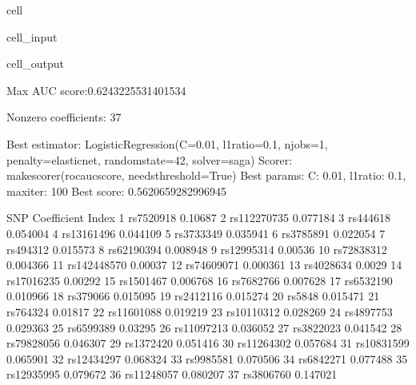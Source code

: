 \documentclass[letterpaper,10pt,english]{jupyterBook}
\begin{document}
\begin{sphinxuseclass}{cell}
\begin{sphinxVerbatimInput}
\begin{sphinxuseclass}{cell_input}
\end{sphinxuseclass}\end{sphinxVerbatimInput}
\begin{sphinxVerbatimOutput}

\begin{sphinxuseclass}{cell_output}
\begin{sphinxVerbatim}[commandchars=\\\{\}]
Max AUC score:0.6243225531401534

Non\PYGZhy{}zero coefficients: 37

Best estimator: LogisticRegression(C=0.01, l1\PYGZus{}ratio=0.1, n\PYGZus{}jobs=\PYGZhy{}1, penalty=\PYGZsq{}elasticnet\PYGZsq{},
                   random\PYGZus{}state=42, solver=\PYGZsq{}saga\PYGZsq{})
Scorer: make\PYGZus{}scorer(roc\PYGZus{}auc\PYGZus{}score, needs\PYGZus{}threshold=True)
Best params: \PYGZob{}\PYGZsq{}C\PYGZsq{}: 0.01, \PYGZsq{}l1\PYGZus{}ratio\PYGZsq{}: 0.1, \PYGZsq{}max\PYGZus{}iter\PYGZsq{}: 100\PYGZcb{}
Best score: 0.5620659282996945
\end{sphinxVerbatim}

\begin{sphinxVerbatim}[commandchars=\\\{\}]
               SNP Coefficient
Index                         
1        rs7520918    \PYGZhy{}0.10687
2      rs112270735   \PYGZhy{}0.077184
3         rs444618   \PYGZhy{}0.054004
4       rs13161496   \PYGZhy{}0.044109
5        rs3733349   \PYGZhy{}0.035941
6        rs3785891   \PYGZhy{}0.022054
7         rs494312   \PYGZhy{}0.015573
8       rs62190394   \PYGZhy{}0.008948
9       rs12995314    \PYGZhy{}0.00536
10      rs72838312   \PYGZhy{}0.004366
11     rs142448570    \PYGZhy{}0.00037
12      rs74609071    0.000361
13       rs4028634      0.0029
14      rs17016235     0.00292
15       rs1501467    0.006768
16       rs7682766    0.007628
17       rs6532190    0.010966
18        rs379066    0.015095
19       rs2412116    0.015274
20          rs5848    0.015471
21        rs764324     0.01817
22      rs11601088    0.019219
23      rs10110312    0.028269
24       rs4897753    0.029363
25       rs6599389     0.03295
26      rs11097213    0.036052
27       rs3822023    0.041542
28      rs79828056    0.046307
29       rs1372420    0.051416
30      rs11264302    0.057684
31      rs10831599    0.065901
32      rs12434297    0.068324
33       rs9985581    0.070506
34       rs6842271    0.077488
35      rs12935995    0.079672
36      rs11248057    0.080207
37       rs3806760    0.147021
\end{sphinxVerbatim}

\end{sphinxuseclass}\end{sphinxVerbatimOutput}

\end{sphinxuseclass}
\end{document}
